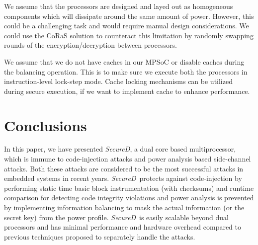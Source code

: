 \documentclass{article}
\newcommand{\SecureD}{\emph{SecureD}}
\begin{document}
We assume that the processors are designed and layed out as homogeneous components which will dissipate 
around the same amount of power. However, this could be a challenging task and would require manual 
design considerations. We could use the CoRaS solution \cite{ambrose12CoRaS} to counteract this limitation
by randomly swapping rounds of the encryption/decryption between processors. 

We assume that we do not have caches in our MPSoC or disable caches during the balancing operation. This is to make
sure we execute both the processors in instruction-level lock-step mode. Cache locking mechanisms \cite{asaduzzaman10improving} can be utilized 
during secure execution, if we want to implement cache to enhance performance. 



\section{Conclusions} \label{conclusions}
In  this  paper,  we  have  presented \SecureD, a dual core     based
multiprocessor, which is immune to code-injection attacks and   power
analysis   based     side-channel     attacks. Both these attacks are
considered to be the most successful attacks in embedded systems   in
recent years. \SecureD\ protects against code-injection by performing
static time basic block instrumentation (with checksums)  and runtime
comparison for detecting code  integrity violations        and  power
analysis  is prevented by implementing information balancing  to mask
the actual information (or the secret key) from the power    profile.
\SecureD\ is easily scalable beyond dual processors and has   minimal
performance and hardware  overhead    compared to previous techniques
proposed to separately handle the attacks.


     
\end{document}
